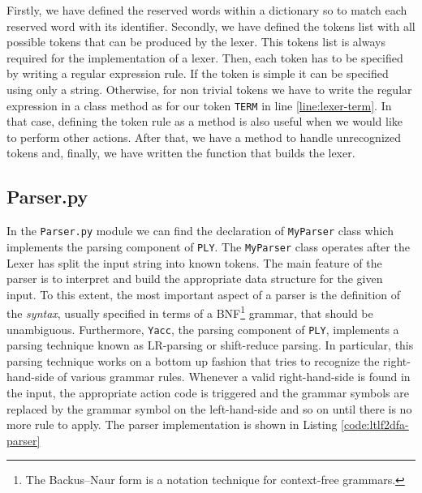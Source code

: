 Firstly, we have defined the reserved words within a dictionary so to match each reserved word with its identifier.
Secondly, we have defined the tokens list with all possible tokens that can be produced by the lexer. This tokens list is always required for the implementation of a lexer.
Then, each token has to be specified by writing a regular expression rule. If the token is simple it can be specified using only a string. Otherwise, for non trivial tokens we have to write the regular expression in a class method as for our token \texttt{TERM} in line \ref{line:lexer-term}. In that case, defining the token rule as a method is also useful when we would like to perform other actions. After that, we have a method to handle unrecognized tokens and, finally, we have written the function that builds the lexer.
\subsection{Parser.py}\label{sec:parser}
In the \texttt{Parser.py} module we can find the declaration of \texttt{MyParser} class which implements the parsing component of \texttt{PLY}. The \texttt{MyParser} class operates after the Lexer has split the input string into known tokens. The main feature of the parser is to interpret and build the appropriate data structure for the given input. To this extent, the most important aspect of a parser is the definition of the \textit{syntax}, usually specified in terms of a BNF\footnote{The Backus–Naur form is a notation technique for context-free grammars.} grammar, that should be unambiguous. Furthermore, \texttt{Yacc}, the parsing component of \texttt{PLY}, implements a parsing technique known as LR-parsing or shift-reduce parsing. In particular, this parsing technique works on a bottom up fashion that tries to recognize the right-hand-side of various grammar rules. Whenever a valid right-hand-side is found in the input, the appropriate action code is triggered and the grammar symbols are replaced by the grammar symbol on the left-hand-side and so on until there is no more rule to apply. The parser implementation is shown in Listing \ref{code:ltlf2dfa-parser}
